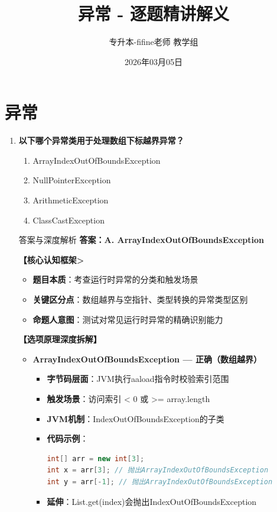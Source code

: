 \documentclass[12pt, a4paper]{ctexart}
\title{\textcolor{myblue}{\textbf{异常 - 逐题精讲解义}}}
\author{专升本-fifine老师 教学组}
\date{2026年03月05日}
\begin{document}
\maketitle
\thispagestyle{empty}
\newpage

\section{异常}

\begin{enumerate}[label=\textbf{\arabic*.}]

	\item \textbf{以下哪个异常类用于处理数组下标越界异常？}
	      \begin{enumerate}[label=\Alph*.]
		      \item ArrayIndexOutOfBoundsException
		      \item NullPointerException
		      \item ArithmeticException
		      \item ClassCastException
	      \end{enumerate}

	      \begin{bluebox}{答案与深度解析}
		      \textbf{答案：A. ArrayIndexOutOfBoundsException}

		      \textbf{【核心认知框架>}
		      \begin{itemize}[label={}, leftmargin=*, nosep]
			      \item \textbf{题目本质}：考查运行时异常的分类和触发场景
			      \item \textbf{关键区分点}：数组越界与空指针、类型转换的异常类型区别
			      \item \textbf{命题人意图}：测试对常见运行时异常的精确识别能力
		      \end{itemize}

		      \textbf{【选项原理深度拆解】}

		      \begin{itemize}[leftmargin=*, nosep, label={}]
			      \item[A] \textbf{ArrayIndexOutOfBoundsException — 正确（数组越界）}
			            \begin{itemize}[label={}, leftmargin=*, nosep]
				            \item \textbf{字节码层面}：JVM执行aaload指令时校验索引范围
				            \item \textbf{触发场景}：访问索引 < 0 或 >= array.length
				            \item \textbf{JVM机制}：IndexOutOfBoundsException的子类
				            \item \textbf{代码示例}：
				                  \begin{lstlisting}[language=Java]
int[] arr = new int[3];
int x = arr[3]; // 抛出ArrayIndexOutOfBoundsException
int y = arr[-1]; // 抛出ArrayIndexOutOfBoundsException
				            \end{lstlisting}
				            \item \textbf{延伸}：List.get(index)会抛出IndexOutOfBoundsException
			            \end{itemize}


\end{itemize}
\end{bluebox}
\end{enumerate}
\end{document}

